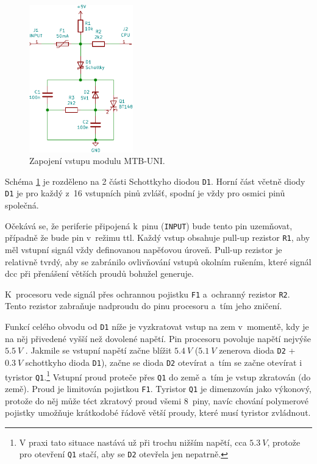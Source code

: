 \begin{figure}[ht]
\includegraphics[width=0.4\textwidth]{data/uni-input/uni-input.pdf}
\caption{Zapojení vstupu modulu MTB-UNI.}
\label{fig:mtbuni-input}
\end{figure}

Schéma \ref{fig:mtbuni-input} je rozděleno na 2 části Schottkyho diodou
\texttt{D1}. Horní část včetně diody \texttt{D1} je pro každý z~16 vstupních
pinů zvlášť, spodní je vždy pro osmici pinů společná.

Očekává se, že periferie připojená k~pinu (\texttt{INPUT}) bude tento pin
uzemňovat, případně že bude pin v~režimu \gls{ttl}. Každý vstup obsahuje
pull-up rezistor \texttt{R1}, aby měl vstupní signál vždy definovanou napěťovou
úroveň. Pull-up rezistor je relativně tvrdý, aby se zabránilo ovlivňování
vstupů okolním rušením, které signál \gls{dcc} při přenášení větších proudů
bohužel generuje.

K~procesoru vede signál přes ochrannou pojistku \texttt{F1} a~ochranný rezistor
\texttt{R2}. Tento rezistor zabraňuje nadproudu do pinu procesoru a~tím jeho
zničení.

Funkcí celého obvodu od \texttt{D1} níže je vyzkratovat vstup na zem v~momentě,
kdy je na něj přivedené vyšší než dovolené napětí. Pin procesoru povoluje
napětí nejvýše $5.5~V$ \cite{atmega128a-datasheet}. Jakmile se vstupní napětí
začne blížit $5.4~V$ ($5.1~V$ zenerova dioda \texttt{D2} + $0.3~V$ schottkyho
dioda \texttt{D1}), začne se dioda \texttt{D2} otevírat a~tím se začne otevírat
i tyristor \texttt{Q1}.\footnote{V praxi tato situace nastává už při trochu
nižším napětí, cca $5.3~V$, protože pro otevření \texttt{Q1} stačí, aby se
\texttt{D2} otevřela jen nepatrně.} Vstupní proud proteče přes \texttt{Q1} do
země a~tím je vstup zkratován (do země). Proud je limitován pojistkou \texttt{F1}.
Tyristor \texttt{Q1} je dimenzován jako výkonový, protože do něj může téct zkratový
proud všemi 8~piny, navíc chování polymerové pojistky umožňuje krátkodobé řádově
větší proudy, které musí tyristor zvládnout.

